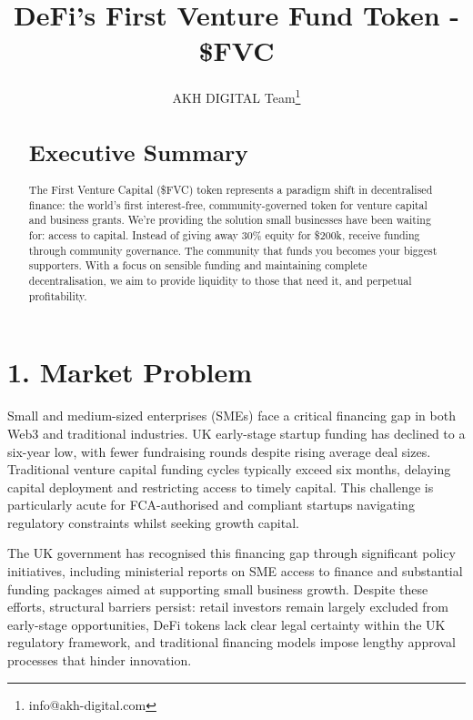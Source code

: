 \documentclass[
  paper=a4,
  ,captions=tableheading
]{scrartcl}
\author{}
\date{}
\title{}
\author{}
\date{}
\begin{document}
\title{DeFi's First Venture Fund Token - \$FVC}
\author{AKH DIGITAL Team\thanks{info@akh-digital.com}}
\maketitle

\begin{abstract}
\section*{Executive Summary}
The First Venture Capital (\$FVC) token represents a paradigm shift in
decentralised finance: the world's first interest-free,
community-governed token for venture capital and business grants. We're
providing the solution small businesses have been waiting for:
access to capital. Instead of giving away 30\% equity for \$200k,
receive funding through community governance. The community that funds
you becomes your biggest supporters. With a focus on sensible funding
and maintaining complete decentralisation, we aim to provide liquidity
to those that need it, and perpetual profitability.
\end{abstract}

\section{1. Market Problem}\label{market-problem}

Small and medium-sized enterprises (SMEs) face a critical financing gap
in both Web3 and traditional industries. UK early-stage startup funding
has declined to a six-year low, with fewer fundraising rounds despite
rising average deal sizes. Traditional venture capital funding cycles
typically exceed six months, delaying capital deployment and restricting
access to timely capital. This challenge is particularly acute for
FCA-authorised and compliant startups navigating regulatory constraints
whilst seeking growth capital.

The UK government has recognised this financing gap through significant
policy initiatives, including ministerial reports on SME access to
finance and substantial funding packages aimed at supporting small
business growth. Despite these efforts, structural barriers persist:
retail investors remain largely excluded from early-stage opportunities,
DeFi tokens lack clear legal certainty within the UK regulatory
framework, and traditional financing models impose lengthy approval
processes that hinder innovation.
\end{document}
